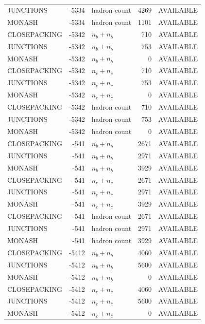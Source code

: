 \begin{landscape}
\begin{longtable}{@{}lrlrl@{}}
JUNCTIONS & -5334 & hadron count & \num{4269} & AVAILABLE \\
MONASH & -5334 & hadron count & \num{1101} & AVAILABLE \\
CLOSEPACKING & -5342 & $n_b+n_{\bar b}$ & \num{710} & AVAILABLE \\
JUNCTIONS & -5342 & $n_b+n_{\bar b}$ & \num{753} & AVAILABLE \\
MONASH & -5342 & $n_b+n_{\bar b}$ & \num{0} & AVAILABLE \\
CLOSEPACKING & -5342 & $n_c+n_{\bar c}$ & \num{710} & AVAILABLE \\
JUNCTIONS & -5342 & $n_c+n_{\bar c}$ & \num{753} & AVAILABLE \\
MONASH & -5342 & $n_c+n_{\bar c}$ & \num{0} & AVAILABLE \\
CLOSEPACKING & -5342 & hadron count & \num{710} & AVAILABLE \\
JUNCTIONS & -5342 & hadron count & \num{753} & AVAILABLE \\
MONASH & -5342 & hadron count & \num{0} & AVAILABLE \\
CLOSEPACKING & -541 & $n_b+n_{\bar b}$ & \num{2671} & AVAILABLE \\
JUNCTIONS & -541 & $n_b+n_{\bar b}$ & \num{2971} & AVAILABLE \\
MONASH & -541 & $n_b+n_{\bar b}$ & \num{3929} & AVAILABLE \\
CLOSEPACKING & -541 & $n_c+n_{\bar c}$ & \num{2671} & AVAILABLE \\
JUNCTIONS & -541 & $n_c+n_{\bar c}$ & \num{2971} & AVAILABLE \\
MONASH & -541 & $n_c+n_{\bar c}$ & \num{3929} & AVAILABLE \\
CLOSEPACKING & -541 & hadron count & \num{2671} & AVAILABLE \\
JUNCTIONS & -541 & hadron count & \num{2971} & AVAILABLE \\
MONASH & -541 & hadron count & \num{3929} & AVAILABLE \\
CLOSEPACKING & -5412 & $n_b+n_{\bar b}$ & \num{4060} & AVAILABLE \\
JUNCTIONS & -5412 & $n_b+n_{\bar b}$ & \num{5600} & AVAILABLE \\
MONASH & -5412 & $n_b+n_{\bar b}$ & \num{0} & AVAILABLE \\
CLOSEPACKING & -5412 & $n_c+n_{\bar c}$ & \num{4060} & AVAILABLE \\
JUNCTIONS & -5412 & $n_c+n_{\bar c}$ & \num{5600} & AVAILABLE \\
MONASH & -5412 & $n_c+n_{\bar c}$ & \num{0} & AVAILABLE \\

\end{longtable}
\end{landscape}
